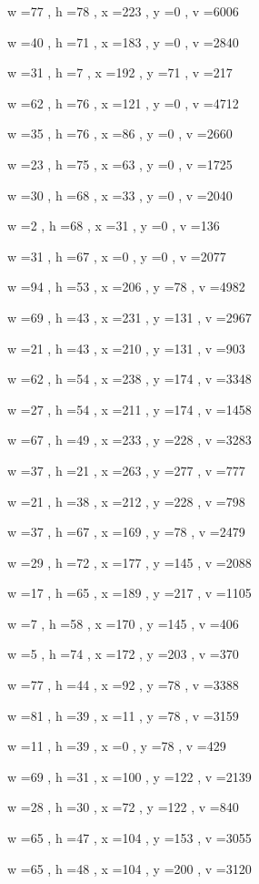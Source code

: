 \documentclass[11pt]{article}
\begin{document}
w =77 , h =78 , x =223 , y =0 , v =6006
\par
w =40 , h =71 , x =183 , y =0 , v =2840
\par
w =31 , h =7 , x =192 , y =71 , v =217
\par
w =62 , h =76 , x =121 , y =0 , v =4712
\par
w =35 , h =76 , x =86 , y =0 , v =2660
\par
w =23 , h =75 , x =63 , y =0 , v =1725
\par
w =30 , h =68 , x =33 , y =0 , v =2040
\par
w =2 , h =68 , x =31 , y =0 , v =136
\par
w =31 , h =67 , x =0 , y =0 , v =2077
\par
w =94 , h =53 , x =206 , y =78 , v =4982
\par
w =69 , h =43 , x =231 , y =131 , v =2967
\par
w =21 , h =43 , x =210 , y =131 , v =903
\par
w =62 , h =54 , x =238 , y =174 , v =3348
\par
w =27 , h =54 , x =211 , y =174 , v =1458
\par
w =67 , h =49 , x =233 , y =228 , v =3283
\par
w =37 , h =21 , x =263 , y =277 , v =777
\par
w =21 , h =38 , x =212 , y =228 , v =798
\par
w =37 , h =67 , x =169 , y =78 , v =2479
\par
w =29 , h =72 , x =177 , y =145 , v =2088
\par
w =17 , h =65 , x =189 , y =217 , v =1105
\par
w =7 , h =58 , x =170 , y =145 , v =406
\par
w =5 , h =74 , x =172 , y =203 , v =370
\par
w =77 , h =44 , x =92 , y =78 , v =3388
\par
w =81 , h =39 , x =11 , y =78 , v =3159
\par
w =11 , h =39 , x =0 , y =78 , v =429
\par
w =69 , h =31 , x =100 , y =122 , v =2139
\par
w =28 , h =30 , x =72 , y =122 , v =840
\par
w =65 , h =47 , x =104 , y =153 , v =3055
\par
w =65 , h =48 , x =104 , y =200 , v =3120
\par
\newpage
\end{document}
